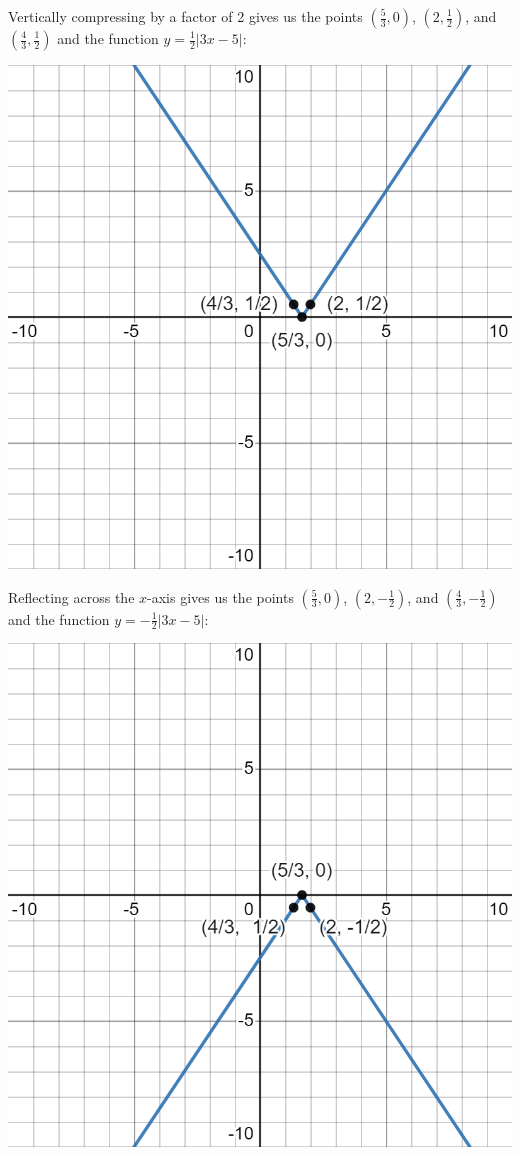 \documentclass[handout, noauthor, nooutcomes]{ximera}
\begin{document}
\begin{example}
\begin{explanation}
Vertically compressing by a factor of 2 gives us the points $\left(\frac{5}{3}, 0\right)$, $\left(2, \frac{1}{2}\right)$, and $\left(\frac{4}{3}, \frac{1}{2}\right)$ and the function $y = \frac{1}{2}|3x - 5|$:

\includegraphics[width=1\linewidth]{images/exgraph4.png}

Reflecting across the $x$-axis gives us the points $\left(\frac{5}{3}, 0\right)$, $\left(2, -\frac{1}{2}\right)$, and $\left(\frac{4}{3}, -\frac{1}{2}\right)$ and the function $y = -\frac{1}{2}|3x - 5|$:

\includegraphics[width=1\linewidth]{images/exgraph5.png}


\end{explanation}
\end{example}
\end{document}
